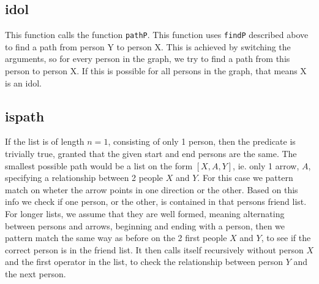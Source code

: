\documentclass[a4paper]{article}
\begin{document}
\subsection*{idol} This function calls the function \texttt{pathP}. This function uses \texttt{findP} described above to find a path from person Y to person X. This is achieved by switching the arguments, so for every person in the graph, we try to find a path from this person to person X. If this is possible for all persons in the graph, that means X is an idol.

\subsection*{ispath}
If the list is of length $n=1$, consisting of only 1 person, then the predicate is trivially true, granted that the given start and end persons are the same.
The smallest possible path would be a list on the form $[X,A,Y]$, ie. only 1 arrow, $A$, specifying a relationship between 2 people $X$ and $Y$. For this case we pattern match on wheter the arrow points in one direction or the other. Based on this info we check if one person, or the other, is contained in that persons friend list.\\
For longer lists, we assume that they are well formed, meaning alternating between persons and arrows, beginning and ending with a person, then we pattern match the same way as before on the 2 first people $X$ and $Y$, to see if the correct person is in the friend list. It then calls itself recursively without person $X$ and the first operator in the list, to check the relationship between person $Y$ and the next person.
\end{document}
